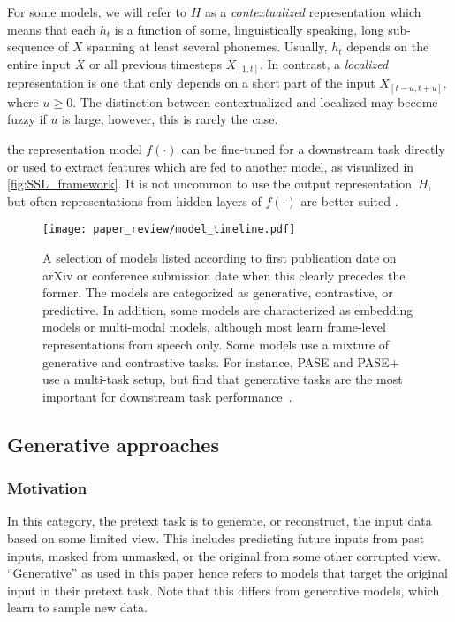 For some models, we will refer to $H$ as a \emph{contextualized} representation which means that each $h_t$ is a function of some, linguistically speaking, long sub-sequence of $X$ spanning at least several phonemes. Usually, $h_t$ depends on the entire input $X$ or all previous timesteps $X_{[1,t]}$. In contrast, a \emph{localized} representation is one that only depends on a short part of the input $X_{[t - u,t + u]}$, where $u \geq 0$. The distinction between contextualized and localized may become fuzzy if $u$ is large, however, this is rarely the case.

 the representation model $f(\cdot)$ can be fine-tuned for a downstream task directly or used to extract features which are fed to another model, as visualized in \cref{fig:SSL_framework}. It is not uncommon to use the output representation~$H$, but often representations from hidden layers of $f(\cdot)$ are better suited \cite{pasad_layerwise_2021}.


\begin{figure*}[t!]
    \centering
    \texttt{[image: paper\_review/model\_timeline.pdf]}
	 \caption{A selection of models listed according to first publication date
	 on arXiv or conference submission date when this clearly precedes the
	 former. The models are categorized as generative, contrastive, or predictive.
	 In addition, some models are characterized as embedding models or
	 multi-modal models, although most learn frame-level
	 representations from speech only. Some models use a mixture of generative
	 and contrastive tasks. For instance, PASE and PASE+ use a multi-task setup,
	 but find that generative tasks are the most important for downstream
	 task performance~\cite{pascual_learning_2019}.}
    \label{fig:timeline}
\end{figure*}


 

\subsection{Generative approaches}
\label{sec:generative}

\subsubsection{Motivation}

In this category, the pretext task is to generate, or reconstruct, the input data based on some limited view. This includes predicting future inputs from past inputs, masked from unmasked, or the original from some other corrupted view.  ``Generative'' as used in this paper hence refers to models that target the original input in their pretext task. Note that this differs from generative models, which learn  to sample new data.

